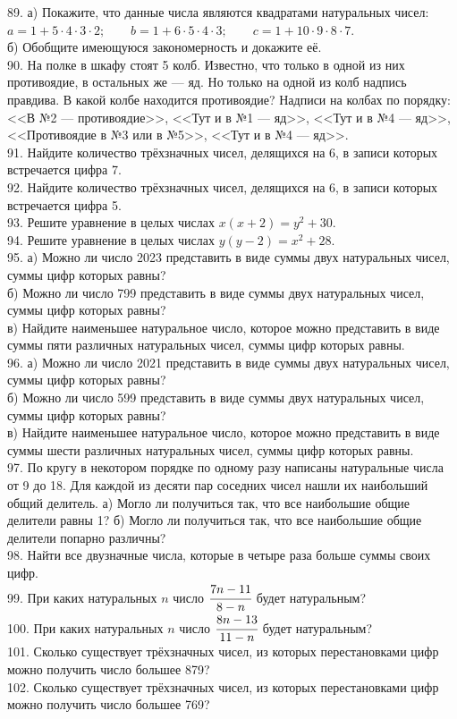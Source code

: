 \documentclass[12pt]{article}
\begin{document}
89. а) Покажите, что данные числа являются квадратами натуральных чисел:\\
$a=1+5\cdot4\cdot3\cdot2;\qquad b=1+6\cdot5\cdot4\cdot3;\qquad c=1+10\cdot9\cdot8\cdot7.$\\
б) Обобщите имеющуюся закономерность и докажите её.\\
90. На полке в шкафу стоят 5 колб. Известно, что только в одной из них противоядие, в остальных же --- яд. Но только на одной из колб надпись правдива. В какой колбе находится противоядие? Надписи на колбах по порядку: <<В №2 --- противоядие>>, <<Тут и в №1 --- яд>>, <<Тут и в №4 --- яд>>, <<Противоядие в №3 или в №5>>,
<<Тут и в №4 --- яд>>.\\
91. Найдите количество трёхзначных чисел, делящихся на 6, в записи которых встречается цифра 7.\\
92. Найдите количество трёхзначных чисел, делящихся на 6, в записи которых встречается цифра 5.\\
93. Решите уравнение в целых числах $x(x+2)=y^2+30.$\\
94. Решите уравнение в целых числах $y(y-2)=x^2+28.$\\
95. а) Можно ли число 2023 представить в виде суммы двух натуральных чисел, суммы цифр которых равны?\\
б) Можно ли число 799 представить в виде суммы двух натуральных чисел, суммы цифр которых равны?\\
в) Найдите наименьшее натуральное число, которое можно представить в виде суммы пяти различных натуральных чисел, суммы цифр которых равны.\\
96. а) Можно ли число 2021 представить в виде суммы двух натуральных чисел, суммы цифр которых равны?\\
б) Можно ли число 599 представить в виде суммы двух натуральных чисел, суммы цифр которых равны?\\
в) Найдите наименьшее натуральное число, которое можно представить в виде суммы шести различных натуральных чисел, суммы цифр которых равны.\\
97. По кругу в некотором порядке по одному разу написаны натуральные числа от 9 до 18. Для каждой из десяти пар соседних чисел нашли их наибольший общий делитель. а) Могло ли получиться так, что все наибольшие общие делители равны 1? б) Могло ли получиться так, что все наибольшие общие делители попарно различны?\\
98. Найти все двузначные числа, которые в четыре раза больше суммы своих цифр.\\
99. При каких натуральных $n$ число $\cfrac{7n-11}{8-n}$ будет натуральным?\\
100. При каких натуральных $n$ число $\cfrac{8n-13}{11-n}$ будет натуральным?\\
101. Сколько существует трёхзначных чисел, из которых перестановками цифр можно получить число большее 879?\\
102. Сколько существует трёхзначных чисел, из которых перестановками цифр можно получить число большее 769?
\newpage
\end{document}
